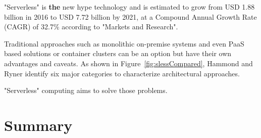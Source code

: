 \begin{enumerate}
    "Serverless" is \textbf{the} new hype technology and is estimated to grow from USD 1.88 billion in 2016 to USD 7.72 billion by 2021, at a Compound Annual Growth Rate (CAGR) of 32.7\% according to "Markets and Research".\autocite{2017Function-as-a-Service2021} 
    
    Traditional approaches such as monolithic on-premise systems and even \acf{PaaS} based solutions or container clusters can be an option but have their own advantages and caveats. As shown in Figure~\vref{fig:slessCompared}, Hammond and Ryner identify six major categories to characterize architectural approaches.

    

    
    
    
    "Serverless" computing aims to solve those problems.\autocite{Roberts2016ServerlessArchitectures}

    
\end{enumerate}
    
\section{Summary}\label{chp:backgroundEND}
